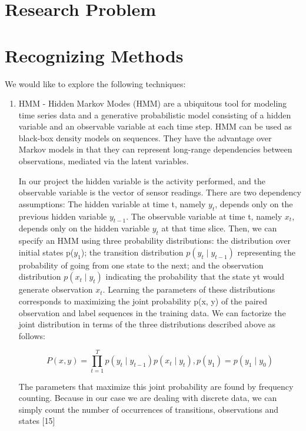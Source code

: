 \documentclass[11pt, oneside]{article}   	%
\begin{document}
\section{Research Problem}

\section{Recognizing Methods}
We would like to explore the following techniques:
	\begin{enumerate}
\item HMM - 
Hidden Markov Modes (HMM) are a ubiquitous tool for modeling time series data and a generative probabilistic model consisting of a hidden variable and an observable variable at each time step. HMM can be used as black-box density models on sequences. They have the advantage over Markov models in that they can represent long-range dependencies between observations, mediated via the latent variables. 

In our project the hidden variable is the activity performed, and the observable variable is the vector of sensor readings. There are two dependency assumptions: The hidden variable at time t, namely $y_{t}$, depends only on the previous hidden variable $y_{t-1}$. The observable variable at time t, namely $x_{t}$, depends only on the hidden variable $y_{t}$ at that time slice. Then, we can specify an HMM using three probability distributions: the distribution over initial states p($y_{1}$); the transition distribution $p(y_{t}\mid y_{t-1})$ representing the probability of going from one state to the next; and the observation distribution $p(x_{t}\mid y_{t})$ indicating the probability that the state yt would generate observation $x_{t}$.
Learning the parameters of these distributions corresponds to maximizing the joint probability p(x, y) of the paired observation and label sequences in the training data. We can factorize the joint distribution in terms of the three distributions described above as follows:

\begin{equation}
P(x,y)=\prod_{t=1}^{T}p(y_{t}\mid y_{t-1})p(x_{t}\mid y_{t}), p(y_{1}) = p(y_{1}\mid y_{0})
\end{equation}

The parameters that maximize this joint probability are found by frequency counting. Because in our case we are dealing with discrete data, we can simply count the number of occurrences of transitions, observations and states [15]


\end{enumerate}
\end{document}
